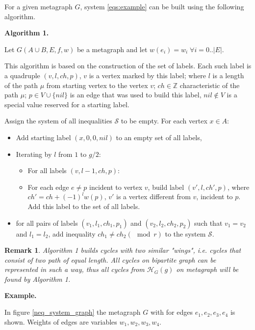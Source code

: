 \documentclass[a4paper,fleqn]{cas-sc}
\newtheorem{notice}{Remark}
\begin{document}

For a given metagraph $G$, system \eqref{eqs:example} can be built using the following algorithm.

\textbf{Algorithm 1.}

Let $G(A \cup B, E, f, w)$ be a metagraph and let $w(e_i) = w_i \; \forall i = 0..|E|$.

This algorithm is based on the construction of the set of labels.
Each such label is a quadruple $(v, l, ch, p)$,
$v$ is a vertex marked by this label;
where $l$ is a length of the path $\mu$ from starting vertex to the vertex $v$; 
$ch \in \mathbb{Z}$ characteristic of the path $\mu$;
$p \in V \cup \{ nil \}$ is an edge that was used to build this label, $nil \not\in V $ is a special value reserved for a starting label.

Assign the system of all inequalities $\mathcal{S}$ to be empty.
For each vertex $x \in A$:

\begin{itemize}
    \item Add starting label $(x, 0, 0, nil)$ to an empty set of all labels,
    \item Iterating by $l$ from $1$ to $g / 2$:
    \begin{itemize}
        \item For all labels $(v, l - 1, ch, p)$:
        \item
            For each edge $e \not= p$ incident to vertex $v$,
            build label $(v', l, ch', p)$, where $ch' = ch + (-1)^{l} w(p)$, $v'$ is a vertex different from $v$, incident to $p$.
            Add this label to the set of all labels.
    \end{itemize}
    \item for all pairs of labels $(v_1, l_1, ch_1, p_1)$ and $(v_2, l_2, ch_2, p_2)$ such that $v_1 = v_2$ and $l_1 = l_2$, add inequality $ch_1 \neq ch_2 (\mod{r})$ to the system $\mathcal{S}$.
\end{itemize}

\begin{notice}
    Algorithm 1 builds cycles with two similar "wings", i.e. cycles that consist of two path of equal length. All cycles on bipartite graph can be represented in such a way, thus all cycles from $\mathcal{H}_G(g)$ on metagraph will be found by Algorithm 1.
\end{notice}

\textbf{Example.}

In figure \ref{neq_system_graph} the metagraph $G$ with for edges $e_1, e_2, e_3, e_4$ is shown. Weights of edges are variables $w_1, w_2, w_3, w_4$.
\end{document}
